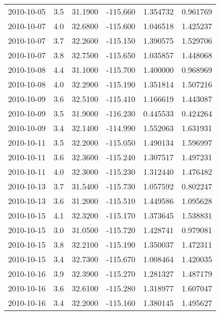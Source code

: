 \begin{tabular}{lrrrrr}
2010-10-05 &       3.5 &  31.1900 &  -115.660 &         1.354732 &         0.961769 \\
2010-10-07 &       4.0 &  32.6800 &  -115.600 &         1.046518 &         1.425237 \\
2010-10-07 &       3.7 &  32.2600 &  -115.150 &         1.390575 &         1.529706 \\
2010-10-07 &       3.8 &  32.7500 &  -115.650 &         1.035857 &         1.448068 \\
2010-10-08 &       4.4 &  31.1000 &  -115.700 &         1.400000 &         0.968969 \\
2010-10-08 &       4.0 &  32.2900 &  -115.190 &         1.351814 &         1.507216 \\
2010-10-09 &       3.6 &  32.5100 &  -115.410 &         1.166619 &         1.443087 \\
2010-10-09 &       3.5 &  31.9000 &  -116.230 &         0.445533 &         0.424264 \\
2010-10-09 &       3.4 &  32.1400 &  -114.990 &         1.552063 &         1.631931 \\
2010-10-11 &       3.5 &  32.2000 &  -115.050 &         1.490134 &         1.596997 \\
2010-10-11 &       3.6 &  32.3600 &  -115.240 &         1.307517 &         1.497231 \\
2010-10-11 &       4.0 &  32.3000 &  -115.230 &         1.312440 &         1.476482 \\
2010-10-13 &       3.7 &  31.5400 &  -115.730 &         1.057592 &         0.802247 \\
2010-10-13 &       3.6 &  31.2000 &  -115.510 &         1.449586 &         1.095628 \\
2010-10-15 &       4.1 &  32.3200 &  -115.170 &         1.373645 &         1.538831 \\
2010-10-15 &       3.0 &  31.0500 &  -115.720 &         1.428741 &         0.979081 \\
2010-10-15 &       3.8 &  32.2100 &  -115.190 &         1.350037 &         1.472311 \\
2010-10-15 &       3.4 &  32.7300 &  -115.670 &         1.008464 &         1.420035 \\
2010-10-16 &       3.9 &  32.3900 &  -115.270 &         1.281327 &         1.487179 \\
2010-10-16 &       3.6 &  32.6100 &  -115.280 &         1.318977 &         1.607047 \\
2010-10-16 &       3.4 &  32.2000 &  -115.160 &         1.380145 &         1.495627 \\

\end{tabular}
